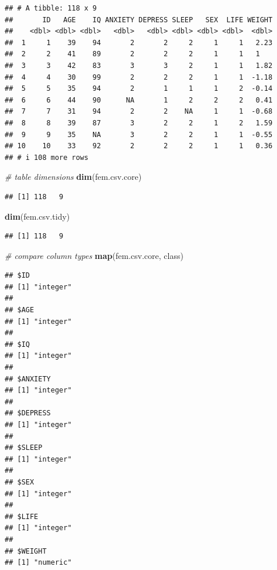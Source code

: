 \documentclass[
]{book}
\newenvironment{Shaded}{\begin{snugshade}}{\end{snugshade}}
\newcommand{\CommentTok}[1]{\textcolor[rgb]{0.56,0.35,0.01}{\textit{#1}}}
\newcommand{\FunctionTok}[1]{\textcolor[rgb]{0.13,0.29,0.53}{\textbf{#1}}}
\newcommand{\NormalTok}[1]{#1}
\begin{document}
\begin{verbatim}
## # A tibble: 118 x 9
##       ID   AGE    IQ ANXIETY DEPRESS SLEEP   SEX  LIFE WEIGHT
##    <dbl> <dbl> <dbl>   <dbl>   <dbl> <dbl> <dbl> <dbl>  <dbl>
##  1     1    39    94       2       2     2     1     1   2.23
##  2     2    41    89       2       2     2     1     1   1   
##  3     3    42    83       3       3     2     1     1   1.82
##  4     4    30    99       2       2     2     1     1  -1.18
##  5     5    35    94       2       1     1     1     2  -0.14
##  6     6    44    90      NA       1     2     2     2   0.41
##  7     7    31    94       2       2    NA     1     1  -0.68
##  8     8    39    87       3       2     2     1     2   1.59
##  9     9    35    NA       3       2     2     1     1  -0.55
## 10    10    33    92       2       2     2     1     1   0.36
## # i 108 more rows
\end{verbatim}

\begin{Shaded}
\begin{Highlighting}[]
\CommentTok{\# table dimensions}
\FunctionTok{dim}\NormalTok{(fem.csv.core)}
\end{Highlighting}
\end{Shaded}

\begin{verbatim}
## [1] 118   9
\end{verbatim}

\begin{Shaded}
\begin{Highlighting}[]
\FunctionTok{dim}\NormalTok{(fem.csv.tidy)}
\end{Highlighting}
\end{Shaded}

\begin{verbatim}
## [1] 118   9
\end{verbatim}

\begin{Shaded}
\begin{Highlighting}[]
\CommentTok{\# compare column types}
\FunctionTok{map}\NormalTok{(fem.csv.core, class)}
\end{Highlighting}
\end{Shaded}

\begin{verbatim}
## $ID
## [1] "integer"
## 
## $AGE
## [1] "integer"
## 
## $IQ
## [1] "integer"
## 
## $ANXIETY
## [1] "integer"
## 
## $DEPRESS
## [1] "integer"
## 
## $SLEEP
## [1] "integer"
## 
## $SEX
## [1] "integer"
## 
## $LIFE
## [1] "integer"
## 
## $WEIGHT
## [1] "numeric"
\end{verbatim}
\end{document}
